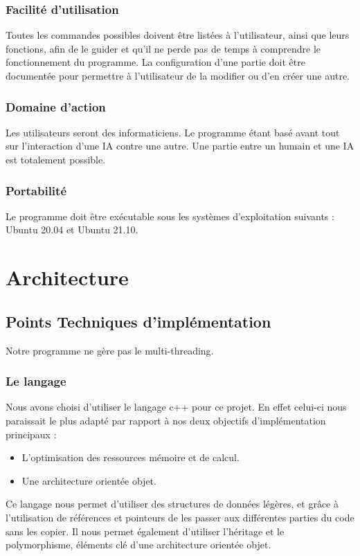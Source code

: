 \huge\documentclass{article}
\begin{document}
\subsubsection{Facilité d'utilisation} 
Toutes les commandes possibles doivent être listées à l'utilisateur, ainsi que leurs fonctions, afin de le guider et qu'il ne perde pas de temps à comprendre le fonctionnement du programme.
La configuration d'une partie doit être documentée pour permettre à l'utilisateur de la modifier ou d'en créer une autre.
\medskip
\subsubsection{Domaine d'action} 
Les utilisateurs seront des informaticiens. Le programme étant basé avant tout sur l'interaction d'une IA contre une autre. 
Une partie entre un humain et une IA est totalement possible.
\medskip
\subsubsection{Portabilité} 
Le programme doit être exécutable sous les systèmes d'exploitation suivants : Ubuntu 20.04 et Ubuntu 21.10.

\newpage
\section{Architecture}

\subsection{Points Techniques d'implémentation}
Notre programme ne gère pas le multi-threading.

\subsubsection{Le langage}

Nous avons choisi d'utiliser le langage c++ pour ce projet. En effet celui-ci nous paraissait le plus adapté par rapport à nos deux objectifs d'implémentation principaux :
\begin{itemize}
    \item L'optimisation des ressources mémoire et de calcul.
    \item Une architecture orientée objet.
\end{itemize}
Ce langage nous permet d'utiliser des structures de données légères, et grâce à l'utilisation de références et pointeurs de les passer aux différentes parties du code sans les copier.
Il nous permet également d'utiliser l'héritage et le polymorphisme, éléments clé d'une architecture orientée objet.
\end{document}
